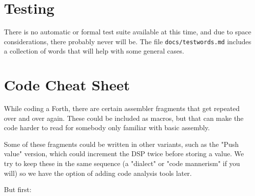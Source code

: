 \section{Testing}

There is no automatic or formal test suite available at this time, and due to
space considerations, there probably never will be. The file
\texttt{docs/testwords.md} includes a collection of words that will help with
some general cases.



\section{Code Cheat Sheet}


While coding a Forth, there are certain assembler fragments that get repeated
over and over again. These could be included as macros, but that can make the
code harder to read for somebody only familiar with basic assembly.

Some of these fragments could be written in other variants, such as the "Push
value" version, which could increment the DSP twice before storing a value. We
try to keep these in the same sequence (a "dialect" or "code mannerism" if you
will) so we have the option of adding code analysis tools later.

But first:

